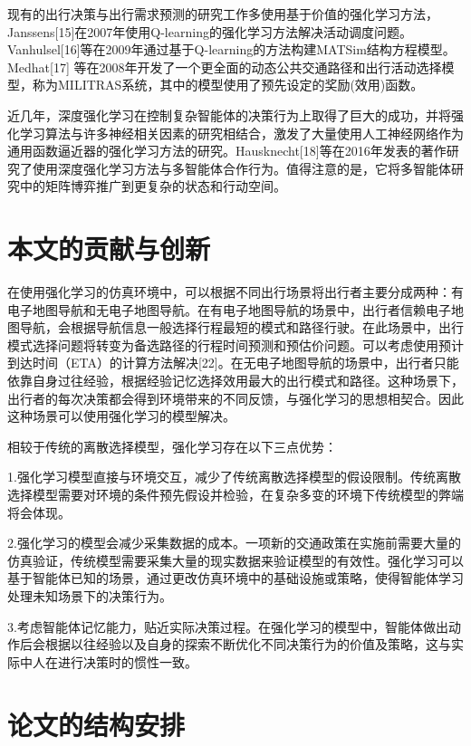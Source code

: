 现有的出行决策与出行需求预测的研究工作多使用基于价值的强化学习方法，Janssens[15]在2007年使用Q-learning的强化学习方法解决活动调度问题。Vanhulsel[16]等在2009年通过基于Q-learning的方法构建MATSim结构方程模型。Medhat[17] 等在2008年开发了一个更全面的动态公共交通路径和出行活动选择模型，称为MILITRAS系统，其中的模型使用了预先设定的奖励(效用)函数。

近几年，深度强化学习在控制复杂智能体的决策行为上取得了巨大的成功，并将强化学习算法与许多神经相关因素的研究相结合，激发了大量使用人工神经网络作为通用函数逼近器的强化学习方法的研究。Hausknecht[18]等在2016年发表的著作研究了使用深度强化学习方法与多智能体合作行为。值得注意的是，它将多智能体研究中的矩阵博弈推广到更复杂的状态和行动空间。


\section{本文的贡献与创新}

在使用强化学习的仿真环境中，可以根据不同出行场景将出行者主要分成两种：有电子地图导航和无电子地图导航。在有电子地图导航的场景中，出行者信赖电子地图导航，会根据导航信息一般选择行程最短的模式和路径行驶。在此场景中，出行模式选择问题将转变为备选路径的行程时间预测和预估价问题。可以考虑使用预计到达时间（ETA）的计算方法解决[22]。在无电子地图导航的场景中，出行者只能依靠自身过往经验，根据经验记忆选择效用最大的出行模式和路径。这种场景下，出行者的每次决策都会得到环境带来的不同反馈，与强化学习的思想相契合。因此这种场景可以使用强化学习的模型解决。

相较于传统的离散选择模型，强化学习存在以下三点优势：

1.强化学习模型直接与环境交互，减少了传统离散选择模型的假设限制。传统离散选择模型需要对环境的条件预先假设并检验，在复杂多变的环境下传统模型的弊端将会体现。

2.强化学习的模型会减少采集数据的成本。一项新的交通政策在实施前需要大量的仿真验证，传统模型需要采集大量的现实数据来验证模型的有效性。强化学习可以基于智能体已知的场景，通过更改仿真环境中的基础设施或策略，使得智能体学习处理未知场景下的决策行为。

3.考虑智能体记忆能力，贴近实际决策过程。在强化学习的模型中，智能体做出动作后会根据以往经验以及自身的探索不断优化不同决策行为的价值及策略，这与实际中人在进行决策时的惯性一致。


\section{论文的结构安排}